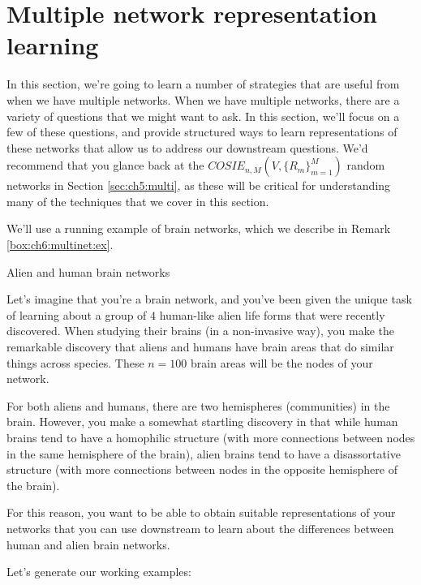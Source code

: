 \section{Multiple network representation learning}
\label{sec:ch6:multinet}

In this section, we're going to learn a number of strategies that are useful from when we have multiple networks. When we have multiple networks, there are a variety of questions that we might want to ask. In this section, we'll focus on a few of these questions, and provide structured ways to learn representations of these networks that allow us to address our downstream questions. We'd recommend that you glance back at the $COSIE_{n, M}\left(V, \{R_m\}_{m = 1}^M\right)$ random networks in Section \ref{sec:ch5:multi}, as these will be critical for understanding many of the techniques that we cover in this section.

We'll use a running example of brain networks, which we describe in Remark \ref{box:ch6:multinet:ex}.

\begin{floatingbox}[h]\caption{Alien and human brain networks}
\label{box:ch6:multinet:ex}
Let's imagine that you're a brain network, and you've been given the unique task of learning about a group of $4$ human-like alien life forms that were recently discovered. When studying their brains (in a non-invasive way), you make the remarkable discovery that aliens and humans have brain areas that do similar things across species. These $n=100$ brain areas will be the nodes of your network.

For both aliens and humans, there are two hemispheres (communities) in the brain. However, you make a somewhat startling discovery in that while human brains tend to have a homophilic structure (with more connections between nodes in the same hemisphere of the brain), alien brains tend to have a disassortative structure (with more connections between nodes in the opposite hemisphere of the brain).

For this reason, you want to be able to obtain suitable representations of your networks that you can use downstream to learn about the differences between human and alien brain networks.
\end{floatingbox}

Let's generate our working examples:


